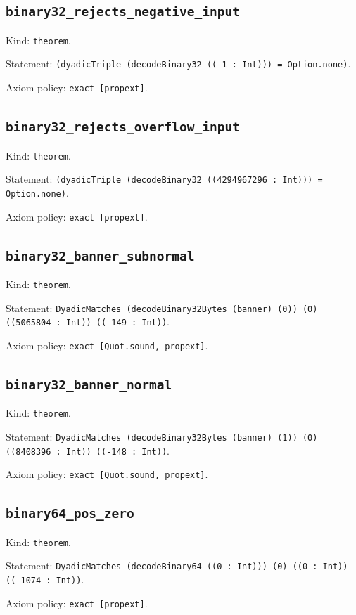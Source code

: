 \documentclass[11pt]{article}
\begin{document}
\subsection*{\texttt{binary32\_rejects\_negative\_input}}
\noindent Kind: \texttt{theorem}.\par
\noindent Statement: \texttt{(dyadicTriple (decodeBinary32 ((-1 : Int))) = Option.none)}.\par
\noindent Axiom policy: \texttt{exact [propext]}.\par
\subsection*{\texttt{binary32\_rejects\_overflow\_input}}
\noindent Kind: \texttt{theorem}.\par
\noindent Statement: \texttt{(dyadicTriple (decodeBinary32 ((4294967296 : Int))) = Option.none)}.\par
\noindent Axiom policy: \texttt{exact [propext]}.\par
\subsection*{\texttt{binary32\_banner\_subnormal}}
\noindent Kind: \texttt{theorem}.\par
\noindent Statement: \texttt{DyadicMatches (decodeBinary32Bytes (banner) (0)) (0) ((5065804 : Int)) ((-149 : Int))}.\par
\noindent Axiom policy: \texttt{exact [Quot.sound, propext]}.\par
\subsection*{\texttt{binary32\_banner\_normal}}
\noindent Kind: \texttt{theorem}.\par
\noindent Statement: \texttt{DyadicMatches (decodeBinary32Bytes (banner) (1)) (0) ((8408396 : Int)) ((-148 : Int))}.\par
\noindent Axiom policy: \texttt{exact [Quot.sound, propext]}.\par
\subsection*{\texttt{binary64\_pos\_zero}}
\noindent Kind: \texttt{theorem}.\par
\noindent Statement: \texttt{DyadicMatches (decodeBinary64 ((0 : Int))) (0) ((0 : Int)) ((-1074 : Int))}.\par
\noindent Axiom policy: \texttt{exact [propext]}.\par
\end{document}
